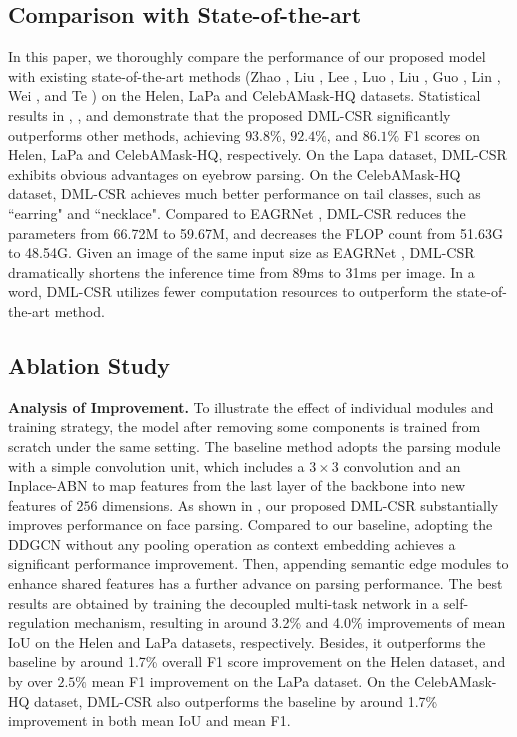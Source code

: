 \documentclass[10pt,twocolumn,letterpaper]{article}
\begin{document}
\subsection{Comparison with State-of-the-art}
In this paper, we thoroughly compare the performance of our proposed model with existing state-of-the-art methods (\ie Zhao \etal \cite{psp}, Liu \etal \cite{lapa}, Lee \etal \cite{CelebAMask-HQ}, Luo \etal \cite{ehanet}, Liu \etal \cite{lius}, Guo \etal \cite{guo2018}, Lin \etal \cite{roiTanh}, Wei \etal \cite{wei_tip}, and Te \etal \cite{te2020edge}) on the Helen, LaPa and CelebAMask-HQ datasets. 
Statistical results in \tableautorefname { \ref{tab:comparision_helen}},  \tableautorefname { \ref{tab:comparision_lapa}}, and \tableautorefname { \ref{tab:comparision_celebA}} demonstrate that the proposed DML-CSR significantly outperforms other methods, achieving $93.8\%$, $92.4\%$, and $86.1\%$ F1 scores on Helen, LaPa and CelebAMask-HQ, respectively. 
On the Lapa dataset, DML-CSR exhibits obvious advantages on eyebrow parsing. 
On the CelebAMask-HQ dataset, DML-CSR achieves much better performance on tail classes, such as ``earring" and ``necklace". 
Compared to EAGRNet \cite{te2020edge}, DML-CSR reduces the parameters from 66.72M to 59.67M, and decreases the FLOP count from 51.63G to 48.54G. Given an image of the same input size as EAGRNet \cite{te2020edge}, DML-CSR dramatically shortens the inference time from 89ms to 31ms per image. In a word, DML-CSR utilizes fewer computation resources to outperform the state-of-the-art method.

\subsection{Ablation Study}

\noindent\textbf{Analysis of Improvement.} To illustrate the effect of individual modules and training strategy, the model after removing some components is trained from scratch under the same setting. The baseline method adopts the parsing module with a simple convolution unit, which includes a $3\times3$ convolution and an Inplace-ABN \cite{inplace} to map features from the last layer of the backbone into new features of $256$ dimensions. As shown in \tableautorefname{ \ref{tab:ablation}}, our proposed DML-CSR substantially improves performance on face parsing. Compared to our baseline, adopting the DDGCN without any pooling operation as context embedding achieves a significant performance improvement.
Then, appending semantic edge modules to enhance shared features has a further advance on parsing performance.
The best results are obtained by training the decoupled multi-task network in a self-regulation mechanism, resulting in around 3.2\% and 4.0\% improvements of mean IoU on the Helen and LaPa datasets, respectively. Besides, it outperforms the baseline by around 1.7\% overall F1 score improvement on the Helen dataset, and by over $2.5\%$ mean F1 improvement on the LaPa dataset. On the CelebAMask-HQ dataset, DML-CSR also outperforms the baseline by around 1.7\% improvement in both mean IoU and mean F1.  
\end{document}
